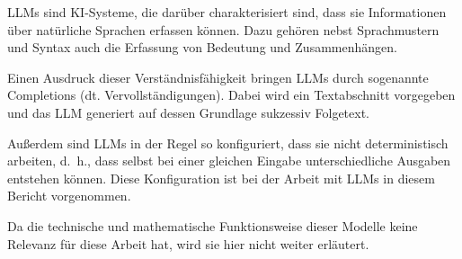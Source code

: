 \documentclass[../main.tex]{subfiles}
\begin{document}
\glspl{LLM} sind \gls{KI}-Systeme, die darüber charakterisiert sind, dass sie Informationen über natürliche Sprachen erfassen können.
Dazu gehören nebst Sprachmustern und Syntax auch die Erfassung von Bedeutung und Zusammenhängen.
~\cite{zheng2023large}

Einen Ausdruck dieser Verständnisfähigkeit bringen \glspl{LLM} durch sogenannte Completions (dt. Vervollständigungen).
Dabei wird ein Textabschnitt vorgegeben und das \gls{LLM} generiert auf dessen Grundlage sukzessiv Folgetext.
~\cite{naveed2023comprehensive}

Außerdem sind \glspl{LLM} in der Regel so konfiguriert, dass sie nicht deterministisch arbeiten, d.\ h., dass selbst bei einer gleichen Eingabe unterschiedliche Ausgaben entstehen können.
Diese Konfiguration ist bei der Arbeit mit \glspl{LLM} in diesem Bericht vorgenommen.
~\cite{ouyang2023llm}

Da die technische und mathematische Funktionsweise dieser Modelle keine Relevanz für diese Arbeit hat, wird sie hier nicht weiter erläutert.
\end{document}
